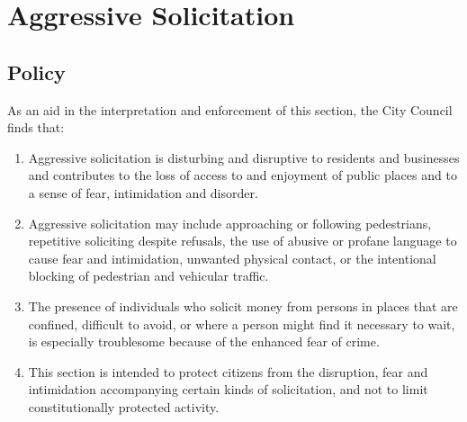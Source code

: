 \section{Aggressive Solicitation}
\subsection{Policy}
As an aid in the interpretation and enforcement of this section, the City Council finds that:
\begin{enumerate}[{\indent}1)]
    \item Aggressive solicitation is disturbing and disruptive to residents and businesses and contributes to the loss of access to and enjoyment of public places and to a sense of fear, intimidation and disorder.
    \item Aggressive solicitation may include approaching or following pedestrians, repetitive soliciting despite refusals, the use of abusive or profane language to cause fear and intimidation, unwanted physical contact, or the intentional blocking of pedestrian and vehicular traffic.
    \item The presence of individuals who solicit money from persons in places that are confined, difficult to avoid, or where a person might find it necessary to wait, is especially troublesome because of the enhanced fear of crime.
    \item This section is intended to protect citizens from the disruption, fear and intimidation accompanying certain kinds of solicitation, and not to limit constitutionally protected activity.
\end{enumerate}
